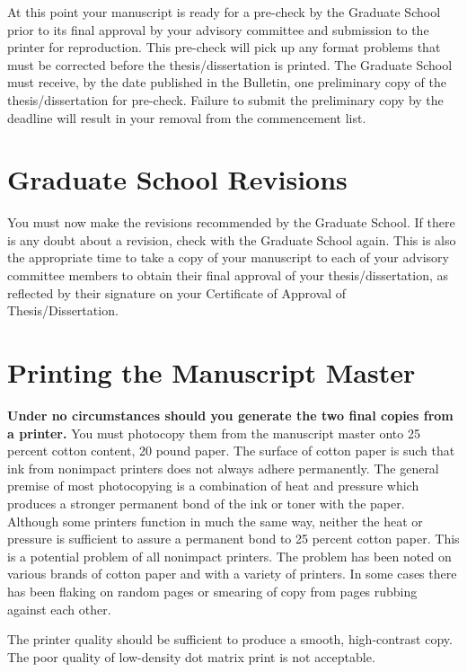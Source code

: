At this point your manuscript is ready for a pre-check by the Graduate
School prior to its final approval by your advisory committee and
submission to the printer for reproduction. This pre-check will pick
up any format problems that must be corrected before the
the\-sis/dis\-ser\-ta\-tion is printed. The Graduate School must
receive, by the date published in the Bulletin, one preliminary copy
of the the\-sis/dis\-ser\-ta\-tion for pre-check. Failure to submit
the preliminary copy by the deadline will result in your removal from
the commencement list.

\section{Graduate School Revisions}
\label{sec:GraduateSchoolRevisions}

You must now make the revisions recommended by the Graduate School. If
there is any doubt about a revision, check with the Graduate School
again. This is also the appropriate time to take a copy of your
manuscript to each of your advisory committee members to obtain their
final approval of your the\-sis/dis\-ser\-ta\-tion, as reflected by
their signature on your Certificate of Approval of
The\-sis/Dis\-ser\-ta\-tion.

\section{Printing the Manuscript Master}
\label{sec:PrintingTheManuscriptMaster}

\textbf{Under no circumstances should you generate the two final
  copies from a printer.} You must photocopy them from the manuscript
master onto 25 percent cotton content, 20 pound paper. The surface of
cotton paper is such that ink from nonimpact printers does not always
adhere permanently. The general premise of most photocopying is a
combination of heat and pressure which produces a stronger permanent
bond of the ink or toner with the paper. Although some printers
function in much the same way, neither the heat or pressure is
sufficient to assure a permanent bond to 25 percent cotton paper. This
is a potential problem of all nonimpact printers. The problem has been
noted on various brands of cotton paper and with a variety of
printers. In some cases there has been flaking on random pages or
smearing of copy from pages rubbing against each other.

The printer quality should be sufficient to produce a smooth,
high-contrast copy. The poor quality of low-density dot matrix print
is not acceptable.

